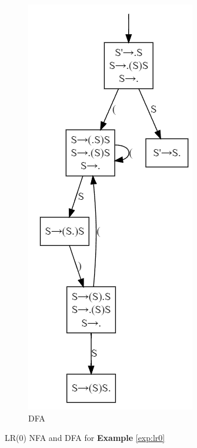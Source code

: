 \begin{figure}[H]
\begin{subfigure}{0.3\linewidth}
    \end{subfigure}
    \begin{subfigure}{0.3\linewidth}
        \centering
        \includegraphics[height=2\linewidth]{pic/CP3/expdfa.png}
        \caption{DFA}
    \end{subfigure}
    \caption{LR(0) NFA and DFA for \textbf{Example} \ref{exp:lr0}}
\end{figure}


